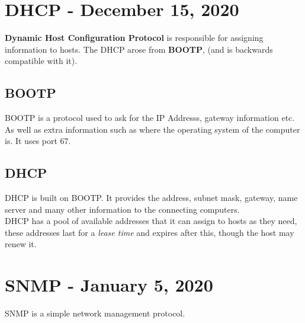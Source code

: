 \documentclass[11pt,a4paper,twoside]{book}
\begin{document}
\chapter{DHCP - December 15, 2020}

\textbf{Dynamic Host Configuration Protocol} is responsible for assigning information to hosts. The DHCP arose from \textbf{BOOTP}, (and is backwards compatible with it).

\section{BOOTP}

BOOTP is a protocol used to ask for the IP Addresss, gateway information etc. As well as extra information such as where the operating system of the computer is. It uses port 67.\\

\section{DHCP}

DHCP is built on BOOTP. It provides the address, subnet mask, gateway, name server and many other information to the connecting computers.\\

DHCP has a pool of available addresses that it can assign to hosts as they need, these addresses last for a \textit{lease time} and expires after this, though the host may renew it.

\chapter{SNMP - January 5, 2020}

SNMP is a simple network management protocol.
\end{document}
